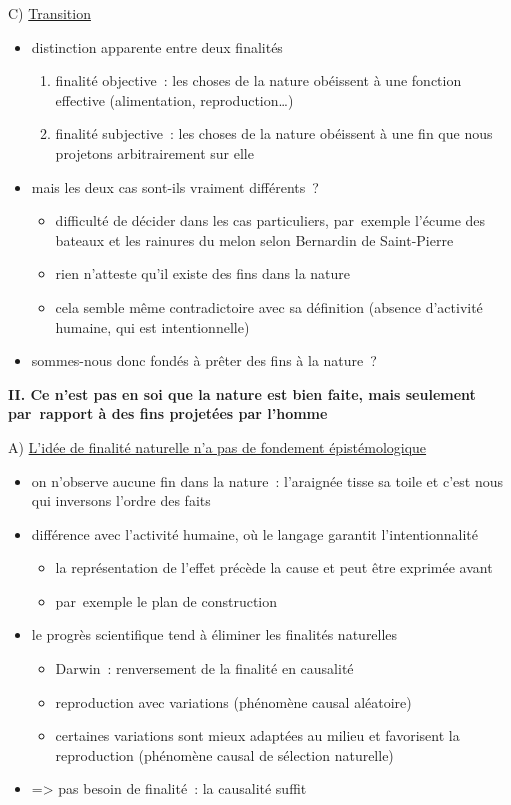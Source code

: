 \documentclass[a4paper,12pt]{report}
\begin{document}
C) \uline{Transition}
\begin{itemize}
\item distinction apparente entre deux finalités
\begin{enumerate}
\item finalité objective : les choses de la nature obéissent à une
fonction effective (alimentation, reproduction\ldots{})
\item finalité subjective : les choses de la nature obéissent à une fin
que nous projetons arbitrairement sur elle
\end{enumerate}
\item mais les deux cas sont-ils vraiment différents ?
\begin{itemize}
\item difficulté de décider dans les cas particuliers, par exemple l'écume
des bateaux et les rainures du melon selon Bernardin de Saint-Pierre
\item rien n'atteste qu'il existe des fins dans la nature
\item cela semble même contradictoire avec sa définition (absence
d'activité humaine, qui est intentionnelle)
\end{itemize}
\item sommes-nous donc fondés à prêter des fins à la nature ?
\end{itemize}

\bigskip


\textbf{II. Ce n'est pas en soi que la nature est bien faite, mais seulement
par rapport à des fins projetées par l'homme}

\medskip

A) \uline{L'idée de finalité naturelle n'a pas de fondement épistémologique}
\begin{itemize}
\item on n'observe aucune fin dans la nature : l'araignée tisse sa toile et
c'est nous qui inversons l'ordre des faits
\item différence avec l'activité humaine, où le langage garantit
l'intentionnalité
\begin{itemize}
\item la représentation de l'effet précède la cause et peut être exprimée
avant
\item par exemple le plan de construction
\end{itemize}
\item le progrès scientifique tend à éliminer les finalités naturelles
\begin{itemize}
\item Darwin : renversement de la finalité en causalité
\item reproduction avec variations (phénomène causal aléatoire)
\item certaines variations sont mieux adaptées au milieu et favorisent la
reproduction (phénomène causal de sélection naturelle)
\end{itemize}
\item => pas besoin de finalité : la causalité suffit
\end{itemize}
\end{document}
